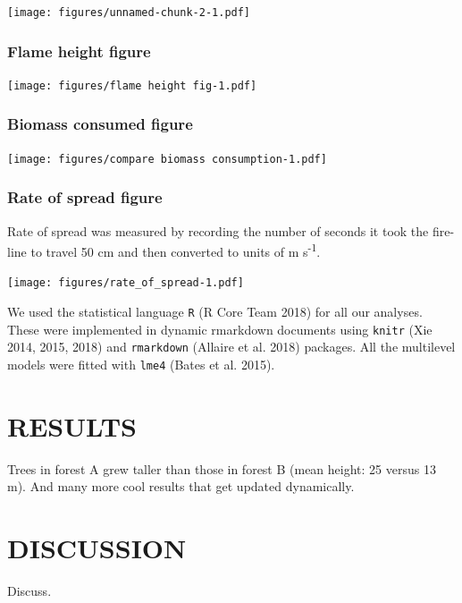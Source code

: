 \documentclass[11pt,a4paper]{article}
\begin{document}
\texttt{[image: figures/unnamed-chunk-2-1.pdf]}

\hypertarget{flame-height-figure}{%
\subsubsection{Flame height figure}\label{flame-height-figure}}

\texttt{[image: figures/flame height fig-1.pdf]}

\hypertarget{biomass-consumed-figure}{%
\subsubsection{Biomass consumed figure}\label{biomass-consumed-figure}}

\texttt{[image: figures/compare biomass consumption-1.pdf]}

\hypertarget{rate-of-spread-figure}{%
\subsubsection{Rate of spread figure}\label{rate-of-spread-figure}}

Rate of spread was measured by recording the number of seconds it took
the fire-line to travel 50 cm and then converted to units of m
s\textsuperscript{-1}.

\texttt{[image: figures/rate\_of\_spread-1.pdf]}

We used the statistical language \texttt{R} (R Core Team 2018) for all
our analyses. These were implemented in dynamic rmarkdown documents
using \texttt{knitr} (Xie 2014, 2015, 2018) and \texttt{rmarkdown}
(Allaire et al. 2018) packages. All the multilevel models were fitted
with \texttt{lme4} (Bates et al. 2015).

\hypertarget{results}{%
\section{RESULTS}\label{results}}

Trees in forest A grew taller than those in forest B (mean height: 25
versus 13 m). And many more cool results that get updated dynamically.

\hypertarget{discussion}{%
\section{DISCUSSION}\label{discussion}}

Discuss.
\end{document}
